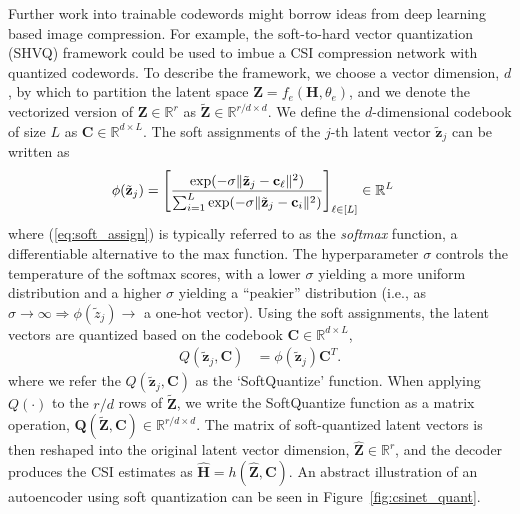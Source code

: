 Further work into trainable codewords might borrow ideas from deep learning based image compression. For example, the soft-to-hard vector quantization (SHVQ) framework \cite{ref:Agustsson2017SoftToHard} could be used to imbue a CSI compression network with quantized codewords. To describe the framework, we choose a vector dimension, $d$, by which to partition the latent space $\mathbf Z = f_e(\mathbf H, \theta_e)$, and we denote the vectorized version of $\mathbf Z \in \mathbb R^{r}$ as $\tilde{\mathbf Z} \in \mathbb R^{r/d \times d}$. We define the $d$-dimensional codebook of size $L$ as $\mathbf C \in \mathbb R^{d\times L}$. The soft assignments of the $j$-th latent vector $\tilde{\mathbf z}_j$ can be written as
\begin{align}
\phi(\tilde{\mathbf z}_j) &= \left[\frac{\text{exp}(-\sigma \Arrowvert \tilde{\mathbf z}_j - \mathbf c_\ell\Arrowvert^2)}{\sum_{i=1}^L\text{exp}(-\sigma \Arrowvert \tilde{\mathbf z}_j - \mathbf c_i\Arrowvert^2)}\right]_{\ell\in [L]} \in \mathbb R^L \label{eq:soft_assign}
\end{align}
where (\ref{eq:soft_assign}) is typically referred to as the \emph{softmax} function, a differentiable alternative to the max function. The hyperparameter $\sigma$ controls the temperature of the softmax scores, with a lower $\sigma$ yielding a more uniform distribution and a higher $\sigma$ yielding a ``peakier'' distribution (i.e., as $\sigma \to \infty \Rightarrow \phi(\tilde z_j) \to $ a one-hot vector). Using the soft assignments, the latent vectors are quantized based on the codebook $\mathbf C \in \mathbb R^{d \times L}$,
\begin{align}
Q(\tilde{\mathbf z}_j,\mathbf C) &= \phi(\tilde{\mathbf z}_j) \mathbf C^T. \label{eq:soft_quant}
\end{align}
where we refer the $Q(\tilde{\mathbf z}_j, \mathbf C)$ as the `SoftQuantize' function. When applying $Q(\cdot)$ to the $r/d$ rows of $\tilde{\mathbf Z}$, we write the SoftQuantize function as a matrix operation, $\mathbf Q(\tilde{\mathbf Z},\mathbf C) \in \mathbb R^{r/d \times d}$. The matrix of soft-quantized latent vectors is then reshaped into the original latent vector dimension, $\hat{\mathbf Z} \in \mathbb R^r$, and the decoder produces the CSI estimates as $\hat{\mathbf H} = h(\hat{\mathbf Z}, \mathbf C)$. An abstract illustration of an autoencoder using soft quantization can be seen in Figure~\ref{fig:csinet_quant}.

\begin{figure*}[!hbtp]
\centering
\def\svgwidth{0.8\linewidth}

\caption{Abstract architecture for a CSI compression network with the `SoftQuantize' layer ($Q(\tilde{\mathbf Z})$), a continuous, softmax-based relaxation of a $d$-dimensional quantization of the latent layer $\mathbf Z$.}
\label{fig:csinet_quant}
\end{figure*}

